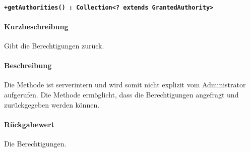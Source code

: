 \paragraph*{\texttt{+getAuthorities() : Collection<? extends GrantedAuthority>}}%
\paragraph*{Kurzbeschreibung}
Gibt die Berechtigungen zurück.
\paragraph*{Beschreibung}
Die Methode ist serverintern und wird somit nicht explizit vom Administrator aufgerufen.
Die Methode ermöglicht, dass die Berechtigungen angefragt und zurückgegeben werden können.
\paragraph*{Rückgabewert}
Die Berechtigungen.
